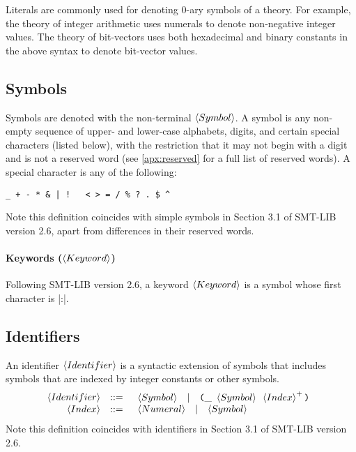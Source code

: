 \documentclass[english,a4paper,10pt]{article}
\begin{document}
\noindent
Literals are commonly
used for denoting $0$-ary symbols of a theory.
For example, 
the theory of integer arithmetic 
uses numerals to denote non-negative integer values.
The theory of bit-vectors uses both
hexadecimal and binary constants in the above syntax
to denote bit-vector values.

\subsection{Symbols}

Symbols are denoted with the non-terminal $\left\langle Symbol\right\rangle$. 
A symbol
is any non-empty sequence of upper- and lower-case alphabets, digits,
and certain special characters (listed below), with the restriction that it may not
begin with a digit and is not a reserved word (see \cref{apx:reserved} 
for a full list of reserved words).
A special character is any of the following:
\begin{center}
  \texttt{\_ + - * \& | ! \string~ < > = / \% ? . \$ \string^}
\end{center}
Note this definition coincides with simple
symbols in Section 3.1 of SMT-LIB version 2.6,
apart from differences in their reserved words.

\paragraph{Keywords ($\left\langle Keyword\right\rangle$)}
Following SMT-LIB version 2.6,
a keyword $\left\langle Keyword\right\rangle$ is a symbol whose first character is \code|:|.

\subsection{Identifiers}

An identifier $\left\langle Identifier\right\rangle$
is a syntactic extension of symbols 
that includes symbols that are indexed by integer constants or other symbols.
\[
\begin{array}{rcl}
\left\langle Identifier\right\rangle & ::= & \begin{array}{ccc}
\left\langle Symbol\right\rangle & | & \texttt{(}{\tt \_}\mbox{ }\left\langle Symbol\right\rangle\mbox{ }\left\langle Index\right\rangle^{+}\texttt{)}
\end{array}\\
\left\langle Index\right\rangle & ::= & \begin{array}{ccc}
\left\langle Numeral\right\rangle & | & \left\langle Symbol\right\rangle
\end{array}\\
\end{array}
\]
Note this definition coincides with
identifiers in Section 3.1 of SMT-LIB version 2.6.
\end{document}
